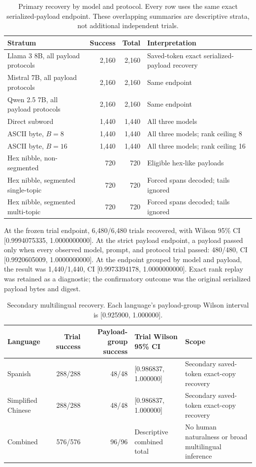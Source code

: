 \documentclass[fleqn,10pt]{wlscirep}
\begin{document}
\begin{table}[H]
\centering
\small
\begin{tabularx}{\textwidth}{L{0.28\textwidth}r r Y}
\toprule
Stratum & Success & Total & Interpretation \\
\midrule
Llama 3 8B, all payload protocols & 2,160 & 2,160 & Saved-token exact serialized-payload recovery \\
Mistral 7B, all payload protocols & 2,160 & 2,160 & Same endpoint \\
Qwen 2.5 7B, all payload protocols & 2,160 & 2,160 & Same endpoint \\
Direct subword & 1,440 & 1,440 & All three models \\
ASCII byte, \(B=8\) & 1,440 & 1,440 & All three models; rank ceiling 8 \\
ASCII byte, \(B=16\) & 1,440 & 1,440 & All three models; rank ceiling 16 \\
Hex nibble, non-segmented & 720 & 720 & Eligible hex-like payloads \\
Hex nibble, segmented single-topic & 720 & 720 & Forced spans decoded; tails ignored \\
Hex nibble, segmented multi-topic & 720 & 720 & Forced spans decoded; tails ignored \\
\bottomrule
\end{tabularx}
\caption{\label{tab:primary-strata}Primary recovery by model and protocol. Every row uses the same exact serialized-payload endpoint. These overlapping summaries are descriptive strata, not additional independent trials.}
\end{table}

At the frozen trial endpoint, 6,480/6,480 trials recovered, with Wilson 95\% CI [0.9994075335, 1.0000000000]. At the strict payload endpoint, a payload passed only when every observed model, prompt, and protocol trial passed: 480/480, CI [0.9920605009, 1.0000000000]. At the endpoint grouped by model and payload, the result was 1,440/1,440, CI [0.9973394178, 1.0000000000]. Exact rank replay was retained as a diagnostic; the confirmatory outcome was the original serialized payload bytes and digest.

\begin{table}[H]
\centering
\small
\begin{tabularx}{\textwidth}{L{0.22\textwidth}r r L{0.24\textwidth}Y}
\toprule
Language & Trial success & Payload-group success & Trial Wilson 95\% CI & Scope \\
\midrule
Spanish & 288/288 & 48/48 & [0.986837, 1.000000] & Secondary saved-token exact-copy recovery \\
Simplified Chinese & 288/288 & 48/48 & [0.986837, 1.000000] & Secondary saved-token exact-copy recovery \\
Combined & 576/576 & 96/96 & Descriptive combined total & No human naturalness or broad multilingual inference \\
\bottomrule
\end{tabularx}
\caption{\label{tab:multilingual}Secondary multilingual recovery. Each language's payload-group Wilson interval is [0.925900, 1.000000].}
\end{table}
\end{document}
